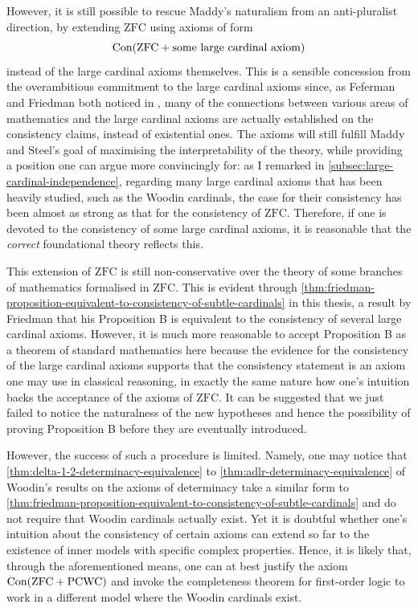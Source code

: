 \documentclass[12pt]{article}
\theoremstyle{plain}
\theoremstyle{definition}
\newcommand{\ZFC}{\mathrm{ZFC}}
\newcommand{\PCWC}{\mathrm{PCWC}}
\DeclareMathOperator{\Con}{Con}
\begin{document}
However, it is still possible to rescue Maddy's naturalism from an anti-pluralist direction, by extending $\ZFC$ using axioms of form
\[\Con\mleft(\ZFC + \text{some large cardinal axiom}\mright)\]
instead of the large cardinal axioms themselves. This is a sensible concession from the overambitious commitment to the large cardinal axioms since, as Feferman and Friedman both noticed in \cite{new-axioms-panel}, many of the connections between various areas of mathematics and the large cardinal axioms are actually established on the consistency claims, instead of existential ones. The axioms will still fulfill Maddy and Steel's goal of maximising the interpretability of the theory, while providing a position one can argue more convincingly for: as I remarked in \autoref{subsec:large-cardinal-independence}, regarding many large cardinal axioms that has been heavily studied, such as the Woodin cardinals, the case for their consistency has been almost as strong as that for the consistency of $\ZFC$. Therefore, if one is devoted to the consistency of some large cardinal axioms, it is reasonable that the \emph{correct} foundational theory reflects this.

This extension of $\ZFC$ is still non-conservative over the theory of some branches of mathematics formalised in $\ZFC$. This is evident through \autoref{thm:friedman-proposition-equivalent-to-consistency-of-subtle-cardinals} in this thesis, a result by Friedman that his Proposition B is equivalent to the consistency of several large cardinal axioms. However, it is much more reasonable to accept Proposition B as a theorem of standard mathematics here because the evidence for the consistency of the large cardinal axioms supports that the consistency statement is an axiom one may use in classical reasoning, in exactly the same nature how one's intuition backs the acceptance of the axioms of $\ZFC$. It can be suggested that we just failed to notice the naturalness of the new hypotheses and hence the possibility of proving Proposition B before they are eventually introduced.

However, the success of such a procedure is limited. Namely, one may notice that \autoref{thm:delta-1-2-determinacy-equivalence} to \autoref{thm:adlr-determinacy-equivalence} of Woodin's results on the axioms of determinacy take a similar form to \autoref{thm:friedman-proposition-equivalent-to-consistency-of-subtle-cardinals} and do not require that Woodin cardinals actually exist. Yet it is doubtful whether one's intuition about the consistency of certain axioms can extend so far to the existence of inner models with specific complex properties. Hence, it is likely that, through the aforementioned means, one can at best justify the axiom $\Con\mleft(\ZFC + \PCWC\mright)$ and invoke the completeness theorem for first-order logic to work in a different model where the Woodin cardinals exist.
\end{document}
